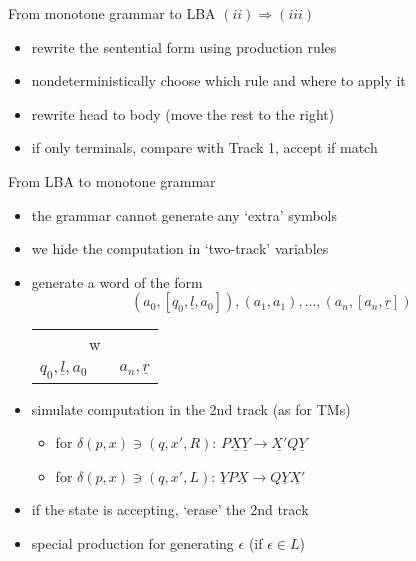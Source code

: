 \documentclass[handout]{beamer}
\begin{document}
\begin{frame}{From monotone grammar to LBA \hfill $(ii)\Rightarrow(iii)$}
\begin{itemize}
        \item rewrite the sentential form using production rules
        \item \alert{nondeterministically choose} which rule and where to apply it
        \item rewrite head to body (move the rest to the right)
        \item if only terminals, compare with Track 1, accept if match\hfill\qedsymbol
    \end{itemize}

\end{frame}


\begin{frame}{From LBA to monotone grammar}
    
    \begin{itemize}
        \item the grammar cannot generate any `extra' symbols
        \item we hide the computation in `two-track' variables
        \item generate a word of the form $$(a_0,\left[q_0,\underline{l},a_0\right]),(a_1,a_1),\ldots,(a_n,\left[a_n,\underline{r}\right]) $$

        \medskip

        \begin{center}
            \begin{tabular}{|c c c|}
            \hline
            \multicolumn{3}{|c|}{w} \\ \cline{1-3}
            \multicolumn{1}{|c|}{$q_0,\underline{l},a_0$}& \hspace{2cm} &\multicolumn{1}{|c|}{$a_n,\underline{r}$}\\\hline
            \end{tabular}
        \end{center}

        \bigskip
        
        \item simulate computation in the 2nd track (as for TMs)
        \begin{itemize}
            \item for $\delta(p,x)\ni(q,x',R)$:  $P\underline{X}\underline{Y}\rightarrow \underline{X'}Q\underline{Y}$ 
            \item for $\delta(p,x)\ni(q,x',L)$:  $\underline{Y}P\underline{X}\rightarrow Q\underline{Y}\underline{X'} $ 
        \end{itemize}
    \item if the state is accepting, `erase' the 2nd track
    \item special production for generating $\epsilon$ (if $\epsilon \in L$)\hfill\qedsymbol
    \end{itemize}

\end{frame}
\end{document}
